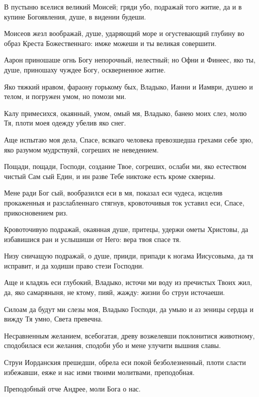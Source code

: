 В пустыню вселися великий Моисей; гряди убо, подражай того житие, да и в купине Богоявления, душе, в видении будеши.

Моисеов жезл воображай, душе, ударяющий море и огустевающий глубину во образ Креста Божественнаго: имже можеши и ты великая совершити.

Аарон приношаше огнь Богу непорочный, нелестный; но Офни и Финеес, яко ты, душе, приношаху чуждее Богу, оскверненное житие.

Яко тяжкий нравом, фараону горькому бых, Владыко, Ианни и Иамври, душею и телом, и погружен умом, но помози ми.

Калу примесихся, окаянный, умом, омый мя, Владыко, банею моих слез, молю Тя, плоти моея одежду убелив яко снег.

Аще испытаю моя дела, Спасе, всякаго человека превозшедша грехами себе зрю, яко разумом мудрствуяй, согреших не неведением.

Пощади, пощади, Господи, создание Твое, согреших, ослаби ми, яко естеством чистый Сам сый Един, и ин разве Тебе никтоже есть кроме скверны.

Мене ради Бог сый, вообразился еси в мя, показал еси чудеса, исцелив прокаженныя и разслабленнаго стягнув, кровоточивыя ток уставил еси, Спасе, прикосновением риз.

Кровоточивую подражай, окаянная душе, притецы, удержи ометы Христовы, да избавишися ран и услышиши от Него: вера твоя спасе тя.

Низу сничащую подражай, о душе, прииди, припади к ногама Иисусовыма, да тя исправит, и да ходиши право стези Господни.

Аще и кладязь еси глубокий, Владыко, источи ми воду из пречистых Твоих жил, да, яко самаряныня, не ктому, пияй, жажду: жизни бо струи источаеши.

Силоам да будут ми слезы моя, Владыко Господи, да умыю и аз зеницы сердца и вижду Тя умно, Света превечна.


Несравненным желанием, всебогатая, древу возжелевши поклонитися животному, сподобилася еси желания, сподоби убо и мене улучити вышния славы.


Струи Иорданския прешедши, обрела еси покой безболезненный, плоти сласти избежавши, еяже и нас изми твоими молитвами, преподобная.

Преподобный отче Андрее, моли Бога о нас.

